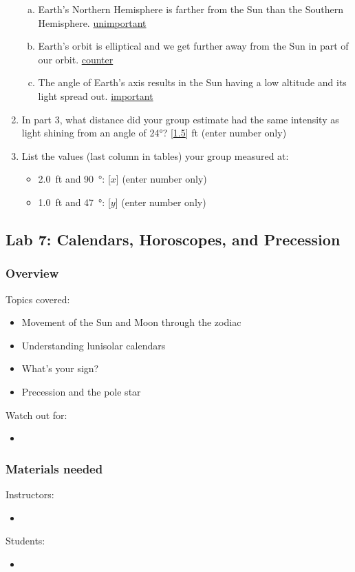 \documentclass[12pt]{article}
\begin{document}
\begin{enumerate}
\begin{enumerate}[a.]
    \item Earth's Northern Hemisphere is farther from the Sun than the Southern Hemisphere. \underline{unimportant}
    \item Earth's orbit is elliptical and we get further away from the Sun in part of our orbit. \underline{counter}
    \item The angle of Earth's axis results in the Sun having a low altitude and its light spread out. \underline{important}
\end{enumerate}
\item
In part 3, what distance did your group estimate had the same intensity as light shining from an angle of 24°? [\underline{1.5}] ft (enter number only)
\item
List the values (last column in tables) your group measured at:
\begin{itemize}
    \item \SI{2.0}{ft} and \SI{90}{\degree}: [$x$] (enter number only)
    \item \SI{1.0}{ft} and \SI{47}{\degree}: [$y$] (enter number only)
\end{itemize}
\end{enumerate}

\newpage
\subsection{Lab 7: Calendars, Horoscopes, and Precession}%
\subsubsection{Overview}
Topics covered:
\begin{itemize}
\item Movement of the Sun and Moon through the zodiac
\item Understanding lunisolar calendars
\item What’s your sign?
\item Precession and the pole star
\end{itemize}
Watch out for:
\begin{itemize}
\item 
\end{itemize}

\subsubsection{Materials needed}
Instructors:
\begin{itemize}
  \item 
\end{itemize}
Students:
\begin{itemize}
  \item 
\end{itemize}
\end{document}
